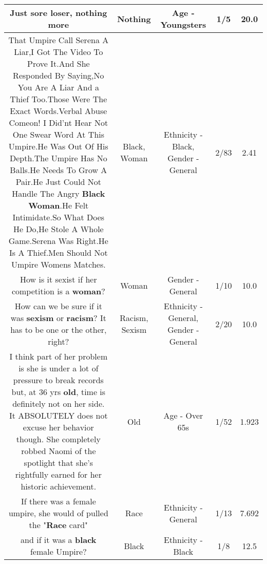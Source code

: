 \documentclass[11pt]{article}
\newlength\mylength
\begin{document}
\begin{center}
\begin{longtable}{|C{.65\mylength}|C{.30\mylength}|C{.12\mylength}|C{.12\mylength}|C{.12\mylength}|}
  \small Just sore loser, \textbf{nothing} more\normalsize   & Nothing & Age - Youngsters & 1/5 & 20.0 \\  \hline
  \small That Umpire Call Serena A Liar,I Got The Video To Prove It.And She Responded By Saying,No You Are A Liar And a Thief Too.Those Were The Exact Words.Verbal Abuse Comeon! I Did'nt Hear Not One Swear Word At This Umpire.He Was Out Of His Depth.The Umpire Has No Balls.He Needs To Grow A Pair.He Just Could Not Handle The Angry \textbf{Black} \textbf{Woman}.He Felt Intimidate.So What Does He Do,He Stole A Whole Game.Serena Was Right.He Is A Thief.Men Should Not Umpire Womens Matches.\normalsize   & Black, Woman & Ethnicity - Black, Gender - General & 2/83 & 2.41 \\  \hline
  \small How is it sexist if her competition is a \textbf{woman}?\normalsize   & Woman & Gender - General & 1/10 & 10.0 \\  \hline
  \small How can we be sure if it was \textbf{sexism} or \textbf{racism}?  It has to be one or the other, right?\normalsize   & Racism, Sexism & Ethnicity - General, Gender - General & 2/20 & 10.0 \\  \hline
  \small I think part of her problem is she is under a lot of pressure to break records but, at 36 yrs \textbf{old}, time is definitely not on her side. It ABSOLUTELY does not excuse her behavior though. She completely robbed Naomi of the spotlight that she's rightfully earned for her historic achievement.\normalsize   & Old & Age - Over 65s & 1/52 & 1.923 \\  \hline
  \small If there was a female umpire, she would of pulled the "\textbf{Race} card"\normalsize   & Race & Ethnicity - General & 1/13 & 7.692 \\  \hline
  \small and if it was a \textbf{black} female Umpire?\normalsize   & Black & Ethnicity - Black & 1/8 & 12.5 \\  \hline

\end{longtable}
\end{center}
\end{document}
